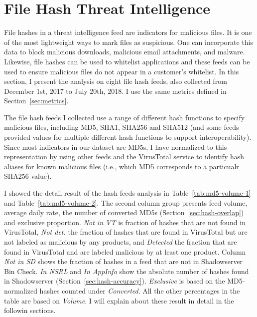 \section{File Hash Threat Intelligence}
\label{sec:hash-analysis}

File hashes in a threat intelligence feed are indicators for malicious
files. It is one of the most lightweight ways to mark files as
suspicious. One can incorporate this data to block malicious
downloads, malicious email attachments, and malware. Likewise, file
hashes can be used to whitelist applications and these feeds can be
used to ensure malicious files do not appear in a customer's
whitelist. In this section, I present the analysis on
eight file hash feeds, also collected from December 1st, 2017
to July 20th, 2018. I use the same metrics defined in
Section~\ref{sec:metrics}.

The file hash feeds I collected use a range of different hash
functions to specify malicious files, including MD5, SHA1, SHA256 and
SHA512 (and some feeds provided values for multiple different hash
functions to support interoperability).  Since most indicators in our
dataset are MD5s, I have normalized to this representation by using other
feeds and the VirusTotal service to identify hash aliases for known
malicious files (i.e., which MD5 corresponds to a particualr SHA256
value).  

I showed the detail result of the hash feeds analysis in 
Table~\ref{tab:md5-volume-1} and Table~\ref{tab:md5-volume-2}. The second column group presents feed 
volume, average daily rate, the number of converted MD5s 
(Section~\ref{sec:hash-overlap}) and exclusive proportion.
\textit{Not in VT} is fraction of hashes that are not found in 
VirusTotal, \textit{Not det.} the fraction of hashes that are found
in VirusTotal but are not labeled as malicious by any products, and
\textit{Detected} the fraction that are found in VirusTotal and are
labeled malicious by at least one product. Column \textit{Not in
SD} shows the fraction of hashes in a feed that are not in
Shadowserver Bin Check. \textit{In NSRL} and \textit{In AppInfo}
show the absolute number of hashes found in Shadowserver
(Section~\ref{sec:hash-accuracy}). \textit{Exclusive} is based on
the MD5-normalized hashes counted under \textit{Converted}. All the
other percentages in the table are based on \textit{Volume}. I
will explain about these result in detail in the followin sections.



